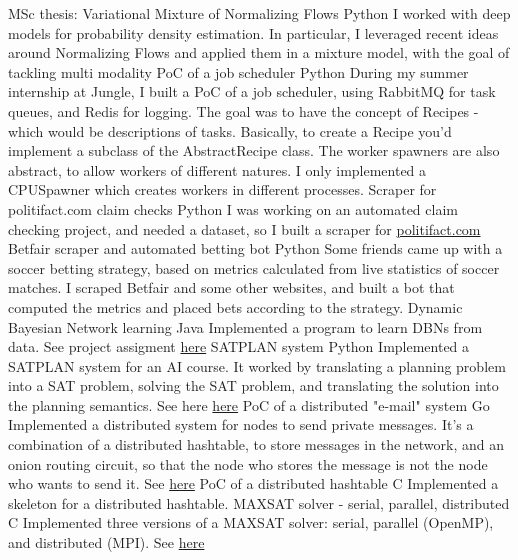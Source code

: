 \documentclass[]{colobas-cv}
\begin{document}
\entry
  {}
  {MSc thesis: Variational Mixture of Normalizing Flows}
  {Python}
  {I worked with deep models for probability density estimation. In particular,
   I leveraged recent ideas around Normalizing Flows and applied them
   in a mixture model, with the goal of tackling multi modality}
\entry
  {}
  {PoC of a job scheduler}
  {Python}
  {During my summer internship at Jungle, I built a PoC of a job scheduler,
  using RabbitMQ for task queues, and Redis for logging. The goal was to have
  the concept of Recipes - which would be descriptions of tasks. Basically,
  to create a Recipe you'd implement a subclass of the AbstractRecipe class.
  The worker spawners are also abstract, to allow workers of different natures.
  I only implemented a CPUSpawner which creates workers in different processes.}
\entry
  {}
  {Scraper for politifact.com claim checks}
  {Python}
  {I was working on an automated claim checking project, and needed a dataset,
  so I built a scraper for \href{politifact.com}{politifact.com}}
\entry
  {}
  {Betfair scraper and automated betting bot}
  {Python}
  {Some friends came up with a soccer betting strategy, based on metrics 
  calculated from live statistics of soccer matches. I scraped Betfair and some
  other websites, and built a bot that computed the metrics and placed bets
  according to the strategy.}
\entry
  {}
  {Dynamic Bayesian Network learning}
  {Java}
  {Implemented a program to learn DBNs from data. See project assigment 
  \href{https://fenix.tecnico.ulisboa.pt/downloadFile/1689468335554723/apresentacao-projecto-POO1415.pdf}{here}}
\entry
  {}
  {SATPLAN system}
  {Python}
  {Implemented a SATPLAN system for an AI course. It worked by translating a
  planning problem into a SAT problem, solving the SAT problem, and translating
  the solution into the planning semantics. See here \href{https://github.com/colobas/ia-proj2}{here}}
\entry
  {}
  {PoC of a distributed "e-mail" system}
  {Go}
  {Implemented a distributed system for nodes to send private messages. It's a
  combination of a distributed hashtable, to store messages in the network, and
  an onion routing circuit, so that the node who stores the message is not the
  node who wants to send it. See \href{https://github.com/colobas/distributed-email}{here}}
\entry
  {}
  {PoC of a distributed hashtable}
  {C}
  {Implemented a skeleton for a distributed hashtable.}
\entry
  {}
  {MAXSAT solver - serial, parallel, distributed}
  {C}
  {Implemented three versions of a MAXSAT solver: serial, parallel (OpenMP), and
  distributed (MPI). See \href{https://github.com/colobas/maxsat-solver}{here}}
\end{document}
